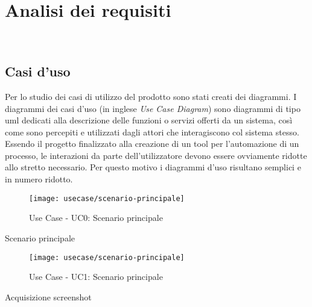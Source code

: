 \chapter{Analisi dei requisiti}
\label{cap:analisi-requisiti}

\\

\section{Casi d'uso}
Per lo studio dei casi di utilizzo del prodotto sono stati creati dei diagrammi.
I diagrammi dei casi d'uso (in inglese \emph{Use Case Diagram}) sono diagrammi di tipo \gls{uml} dedicati alla descrizione delle funzioni o servizi offerti da un sistema, così come sono percepiti e utilizzati dagli attori che interagiscono col sistema stesso.
Essendo il progetto finalizzato alla creazione di un tool per l'automazione di un processo, le interazioni da parte dell'utilizzatore devono essere ovviamente ridotte allo stretto necessario. Per questo motivo i diagrammi d'uso risultano semplici e in numero ridotto.
\begin{figure}[!h] 
    \centering 
    \texttt{[image: usecase/scenario-principale]} 
    \caption{Use Case - UC0: Scenario principale}
\end{figure}

\begin{usecase}{0}{Scenario principale}
    \label{uc:scenario-principale}
\end{usecase}

\begin{figure}[!h] 
    \centering 
    \texttt{[image: usecase/scenario-principale]} 
    \caption{Use Case - UC1: Scenario principale}
\end{figure}

\begin{usecase}{1}{Acquisizione screenshot} 
    \label{uc:acquisizione-screenshot} 
\end{usecase}


